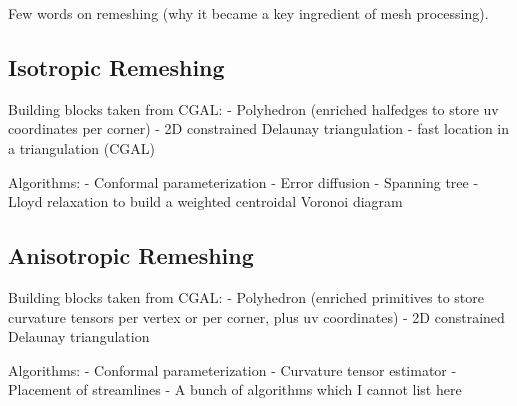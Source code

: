 
\label{sec:remeshing}

Few words on remeshing (why it became a key ingredient of mesh
processing).

\subsection{Isotropic Remeshing}

Building blocks taken from CGAL:
- Polyhedron (enriched halfedges to store 
              uv coordinates per corner)
- 2D constrained Delaunay triangulation
- fast location in a triangulation (CGAL)

Algorithms:
- Conformal parameterization
- Error diffusion
- Spanning tree
- Lloyd relaxation to build a weighted 
  centroidal Voronoi diagram

\subsection{Anisotropic Remeshing}

Building blocks taken from CGAL:
- Polyhedron (enriched primitives to store curvature tensors per
vertex or per corner, plus uv coordinates)
- 2D constrained Delaunay triangulation

Algorithms:
- Conformal parameterization
- Curvature tensor estimator
- Placement of streamlines
- A bunch of algorithms which I cannot list here

